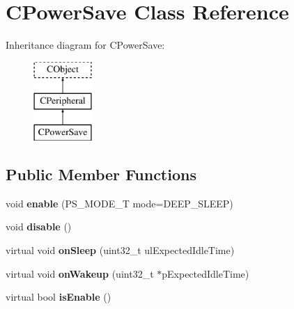 \hypertarget{class_c_power_save}{\section{C\-Power\-Save Class Reference}
\label{class_c_power_save}
}
Inheritance diagram for C\-Power\-Save\-:\begin{figure}[H]
\begin{center}
\leavevmode
\includegraphics[height=3.000000cm]{class_c_power_save}
\end{center}
\end{figure}
\subsection*{Public Member Functions}
\begin{DoxyCompactItemize}
\item 
\hypertarget{class_c_power_save_a47741a6376b9b3065422d37d49851f25}{void {\bfseries enable} (P\-S\-\_\-\-M\-O\-D\-E\-\_\-\-T mode=D\-E\-E\-P\-\_\-\-S\-L\-E\-E\-P)}\label{class_c_power_save_a47741a6376b9b3065422d37d49851f25}

\item 
\hypertarget{class_c_power_save_a4311f52789a5e20f2a37ebddb1228e36}{void {\bfseries disable} ()}\label{class_c_power_save_a4311f52789a5e20f2a37ebddb1228e36}

\item 
\hypertarget{class_c_power_save_a646cda9a3b424a1cb4e1dbf5b9d4870f}{virtual void {\bfseries on\-Sleep} (uint32\-\_\-t ul\-Expected\-Idle\-Time)}\label{class_c_power_save_a646cda9a3b424a1cb4e1dbf5b9d4870f}

\item 
\hypertarget{class_c_power_save_a3c0304fe662448a763f8addb03a0f342}{virtual void {\bfseries on\-Wakeup} (uint32\-\_\-t $\ast$p\-Expected\-Idle\-Time)}\label{class_c_power_save_a3c0304fe662448a763f8addb03a0f342}

\item 
\hypertarget{class_c_power_save_ae7f5e81053c530c03deef192c10f93d5}{virtual bool {\bfseries is\-Enable} ()}\label{class_c_power_save_ae7f5e81053c530c03deef192c10f93d5}

\end{DoxyCompactItemize}
